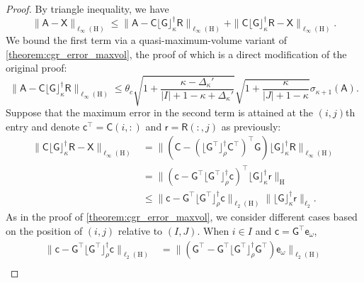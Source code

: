 \documentclass[10pt,a4paper]{amsart}
\newcommand{\Batrix}[1]{\bm{\Matrix{#1}}}
\newcommand{\Hilb}{\mathrm{H}}
\newcommand{\Index}[1]{{#1}}
\newcommand{\Matrix}[1]{\mathsf{#1}}
\newcommand{\Norm}[3][]{#1\| #2 #1\|_{\mathrm{#3}}}
\newcommand{\pinv}{\dagger}
\newcommand{\trans}{\intercal}
\newcommand{\truncate}[3][]{#1\lfloor #2 #1\rfloor_{#3}}
\begin{document}
\begin{proof}
By triangle inequality, we have
\begin{equation*}
    \Norm{\Batrix{A} - \Batrix{X}}{\ell_{\infty}(\Hilb)} \leq \Norm{\Batrix{A} - \Batrix{C} \truncate{\Batrix{G}}{\kappa}^\pinv \Batrix{R}}{\ell_{\infty}(\Hilb)} + \Norm{\Batrix{C} \truncate{\Batrix{G}}{\kappa}^\pinv \Batrix{R} - \Batrix{X}}{\ell_{\infty}(\Hilb)}.
\end{equation*}
We bound the first term via a quasi-maximum-volume variant of \cref{theorem:cgr_error_maxvol}, the proof of which is a direct modification of the original proof:
\begin{equation*}
    \Norm{\Batrix{A} - \Batrix{C} \truncate{\Batrix{G}}{\kappa}^\pinv \Batrix{R}}{\ell_{\infty}(\Hilb)} \leq \theta_c \sqrt{1 + \frac{\kappa - \Delta_\kappa'}{|\Index{I}| + 1 - \kappa + \Delta_\kappa'}} \sqrt{1 + \frac{\kappa}{|\Index{J}| + 1 - \kappa}} \sigma_{\kappa + 1}(\Batrix{A}).
\end{equation*}
Suppose that the maximum error in the second term is attained at the $(i,j)$th entry and denote $\Batrix{c}^\trans = \Batrix{C}(i,:)$ and $\Batrix{r} = \Batrix{R}(:, j)$ as previously:
\begin{align*}
    \Norm{\Batrix{C} \truncate{\Batrix{G}}{\kappa}^\pinv \Batrix{R} - \Batrix{X}}{\ell_{\infty}(\Hilb)} &= \Norm{(\Batrix{C} - (\truncate{\Batrix{G}^\trans}{\rho}^\pinv \Batrix{C}^\trans)^\trans \Batrix{G}) \truncate{\Batrix{G}}{\kappa}^\pinv \Batrix{R}}{\ell_{\infty}(\Hilb)} \\
    &= \Norm{(\Batrix{c} - \Batrix{G}^\trans \truncate{\Batrix{G}^\trans}{\rho}^\pinv \Batrix{c})^\trans \truncate{\Batrix{G}}{\kappa}^\pinv \Batrix{r}}{\Hilb} \\
    &\leq \Norm{\Batrix{c} - \Batrix{G}^\trans \truncate{\Batrix{G}^\trans}{\rho}^\pinv \Batrix{c}}{\ell_2(\Hilb)} \Norm{\truncate{\Batrix{G}}{\kappa}^\pinv \Batrix{r}}{\ell_2}.
\end{align*}
As in the proof of \cref{theorem:cgr_error_maxvol}, we consider different cases based on the position of $(i,j)$ relative to $(\Index{I}, \Index{J})$.
When $i \in \Index{I}$ and $\Batrix{c} = \Batrix{G}^\trans \Matrix{e}_{\omega}$,
\begin{align*}
    \Norm{\Batrix{c} - \Batrix{G}^\trans \truncate{\Batrix{G}^\trans}{\rho}^\pinv \Batrix{c}}{\ell_2(\Hilb)} &= \Norm{(\Batrix{G}^\trans - \Batrix{G}^\trans \truncate{\Batrix{G}^\trans}{\rho}^\pinv \Batrix{G}^\trans) \Matrix{e}_{\omega}}{\ell_2(\Hilb)} \\

\end{align*}
\end{proof}
\end{document}
